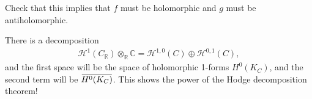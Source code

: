 \begin{exercise}[?]

Check that this implies that \(f\) must be holomorphic and \(g\) must be
antiholomorphic.

\end{exercise}

\begin{fact}

There is a decomposition
\begin{align*}
{\mathcal{H}}^1(C_{\mathbb{R}}) \otimes_{\mathbb{R}}{\mathbb{C}}= {\mathcal{H}}^{1, 0}(C) \oplus {\mathcal{H}}^{0, 1}(C)
,\end{align*}
and the first space will be the space of holomorphic 1-forms
\(H^0(K_C)\), and the second term will be
\(\mkern 1.5mu\overline{\mkern-1.5muH^0(K_C)\mkern-1.5mu}\mkern 1.5mu\).
This shows the power of the Hodge decomposition theorem!

\end{fact}

\cleardoublepage

\renewcommand{\listtheoremname}{}
\listoftheorems[ignoreall,show={definition}, numwidth=3.5em]
\cleardoublepage

\renewcommand{\listtheoremname}{}
\listoftheorems[ignoreall,show={theorem,proposition}, numwidth=3.5em]
\cleardoublepage

\renewcommand{\listtheoremname}{}
\listoftheorems[ignoreall,show={exercise}, numwidth=3.5em]
\cleardoublepage

\listoffigures
\cleardoublepage


\printbibliography[title=Bibliography]



